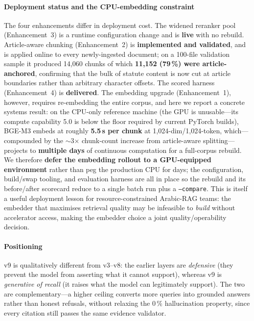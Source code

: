 \documentclass[final,1p,times]{elsarticle}
\begin{document}
\paragraph{Deployment status and the CPU-embedding constraint} The four
enhancements differ in deployment cost. The widened reranker pool (Enhancement~3)
is a runtime configuration change and is \textbf{live} with no rebuild.
Article-aware chunking (Enhancement~2) is \textbf{implemented and validated}, and
is applied online to every newly-ingested document; on a 100-file validation sample
it produced 14{,}060 chunks of which \textbf{11{,}152 (79\,\%) were article-anchored},
confirming that the bulk of statute content is now cut at article boundaries rather
than arbitrary character offsets. The scored harness (Enhancement~4) is
\textbf{delivered}. The embedding upgrade (Enhancement~1), however, requires
re-embedding the entire corpus, and here we report a concrete systems result: on the
CPU-only reference machine (the GPU is unusable---its compute capability 5.0 is below
the floor required by current PyTorch builds), BGE-M3 embeds at roughly
\textbf{5.5\,s per chunk} at 1{,}024-dim/1{,}024-token, which---compounded by the
$\sim$3$\times$ chunk-count increase from article-aware splitting---projects to
\textbf{multiple days} of continuous computation for a full-corpus rebuild. We
therefore \textbf{defer the embedding rollout to a GPU-equipped environment} rather
than peg the production CPU for days; the configuration, build/swap tooling, and
evaluation harness are all in place so the rebuild and its before/after scorecard
reduce to a single batch run plus a \texttt{--compare}. This is itself a useful
deployment lesson for resource-constrained Arabic-RAG teams: the embedder that
maximises retrieval quality may be infeasible to \emph{build} without accelerator
access, making the embedder choice a joint quality/operability decision.

\paragraph{Positioning} v9 is qualitatively different from v3--v8: the earlier
layers are \emph{defensive} (they prevent the model from asserting what it cannot
support), whereas v9 is \emph{generative of recall} (it raises what the model can
legitimately support). The two are complementary---a higher ceiling converts more
queries into grounded answers rather than honest refusals, without relaxing the
0\,\% hallucination property, since every citation still passes the same evidence
validator.
\end{document}
